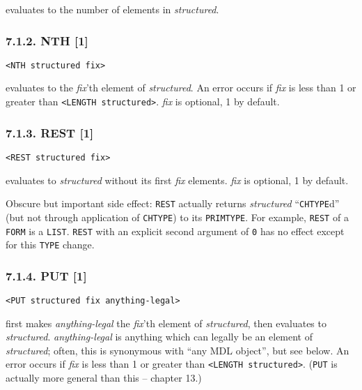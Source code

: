 \documentclass[a4paper,]{article}
\begin{document}
 evaluates to the number of elements in \emph{structured}.

\subsubsection{7.1.2. NTH {[}1{]}}\label{nth-1}

\begin{verbatim}
<NTH structured fix>
\end{verbatim}

 evaluates to the \emph{fix}'th element of \emph{structured}. An error occurs if \emph{fix} is
less than 1 or greater than \texttt{\textless{}LENGTH\ structured\textgreater{}}. \emph{fix} is optional, 1 by default.

\subsubsection{7.1.3. REST {[}1{]}}\label{rest-1}

\begin{verbatim}
<REST structured fix>
\end{verbatim}

 evaluates to \emph{structured} without its first \emph{fix} elements. \emph{fix} is optional,
1 by default.

Obscure but important side effect: \texttt{REST} actually returns \emph{structured} ``\texttt{CHTYPE}d'' (but not through
application of \texttt{CHTYPE}) to its \texttt{PRIMTYPE}. For example, \texttt{REST} of a \texttt{FORM} is a \texttt{LIST}.
\texttt{REST} with an explicit second argument of \texttt{0} has no effect except for this \texttt{TYPE} change.

\subsubsection{7.1.4. PUT {[}1{]}}\label{put-1}

\begin{verbatim}
<PUT structured fix anything-legal>
\end{verbatim}

 first makes \emph{anything-legal} the \emph{fix}'th element of \emph{structured}, then
evaluates to \emph{structured}. \emph{anything-legal} is anything which can legally be an element of \emph{structured};
often, this is synonymous with ``any MDL object'', but see below. An error occurs if \emph{fix} is less than 1 or greater
than \texttt{\textless{}LENGTH\ structured\textgreater{}}. (\texttt{PUT} is actually more general than this -- chapter 13.)
\end{document}
